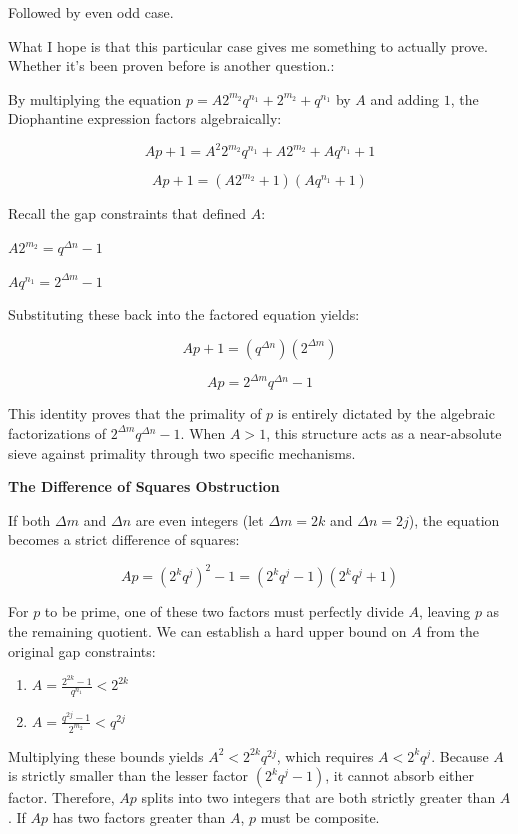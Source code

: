 \documentclass{article}
\begin{document}
Followed by even odd case.

What I hope is that this particular case gives me something to actually prove. Whether it's been proven before is another question.:

By multiplying the equation $p = A 2^{m_2} q^{n_1} + 2^{m_2} + q^{n_1}$ by $A$ and adding $1$, the Diophantine expression factors algebraically:

$$Ap + 1 = A^2 2^{m_2} q^{n_1} + A 2^{m_2} + A q^{n_1} + 1$$

$$Ap + 1 = (A 2^{m_2} + 1)(A q^{n_1} + 1)$$

Recall the gap constraints that defined $A$:

$A 2^{m_2} = q^{\Delta n} - 1$

$A q^{n_1} = 2^{\Delta m} - 1$

Substituting these back into the factored equation yields:

$$Ap + 1 = (q^{\Delta n})(2^{\Delta m})$$

$$Ap = 2^{\Delta m} q^{\Delta n} - 1$$

This identity proves that the primality of $p$ is entirely dictated by the algebraic factorizations of $2^{\Delta m} q^{\Delta n} - 1$. When $A > 1$, this structure acts as a near-absolute sieve against primality through two specific mechanisms.

\textbf{The Difference of Squares Obstruction}

If both $\Delta m$ and $\Delta n$ are even integers (let $\Delta m = 2k$ and $\Delta n = 2j$), the equation becomes a strict difference of squares:

$$Ap = (2^k q^j)^2 - 1 = (2^k q^j - 1)(2^k q^j + 1)$$

For $p$ to be prime, one of these two factors must perfectly divide $A$, leaving $p$ as the remaining quotient. We can establish a hard upper bound on $A$ from the original gap constraints:

\begin{enumerate}
    \item $A = \frac{2^{2k} - 1}{q^{n_1}} < 2^{2k}$
    \item $A = \frac{q^{2j} - 1}{2^{m_2}} < q^{2j}$
\end{enumerate}

Multiplying these bounds yields $A^2 < 2^{2k} q^{2j}$, which requires $A < 2^k q^j$.
Because $A$ is strictly smaller than the lesser factor $(2^k q^j - 1)$, it cannot absorb either factor. Therefore, $Ap$ splits into two integers that are both strictly greater than $A$. If $Ap$ has two factors greater than $A$, $p$ must be composite.
\end{document}
